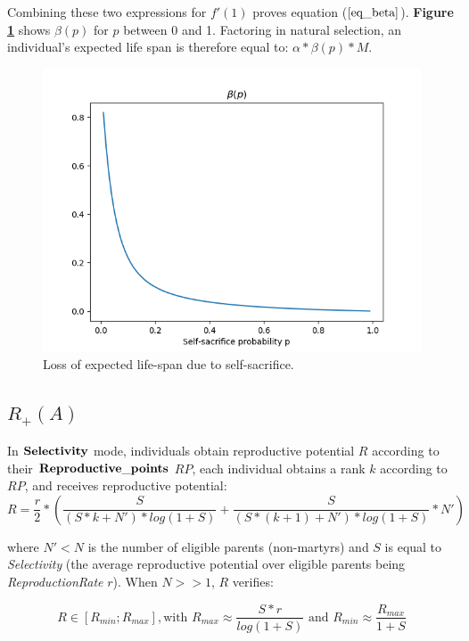 \documentclass[a4paper,12pt]{report}
\begin{document}
Combining these two expressions for $f'(1)$ proves equation ($\bf\ref{eq_beta}$). \textbf{Figure \ref{fig:beta}} shows
$\beta(p)$ for $p$ between 0 and 1. Factoring in natural selection, an individual's expected life span is therefore equal to: $\alpha*\beta(p)*M$.

\begin{figure}[h]
    \centering
    \includegraphics[width=1\textwidth]{Beta}
    \caption{Loss of expected life-span due to self-sacrifice.}
    \label{fig:beta}
    \end{figure}
    



\subsection{$R_{+}(A)$}
\label{ss:R+}
In $\bf{Selectivity}$ mode, individuals obtain reproductive potential $R$ according to their
$\bf{Reproductive\_points}$ $RP$, each individual obtains a rank $k$
according to $RP$, and receives reproductive potential:
\[ R = \frac{r}{2} * (\frac{S}
{(S*k + N')*log(1+S)} + \frac{S}{(S*(k+1) + N')*log(1+S)}*N') \]

where $N'<N$ is the number of eligible parents (non-martyrs) and $S$ is equal to \emph{Selectivity}
(the average reproductive potential over eligible parents being \emph{ReproductionRate} $r$).
When $N >> 1$, $R$ verifies:

\begin{equation}
    R \in [R_{min};R_{max}], \textrm{with } R_{max} \approx \frac{S*r}{log(1+S)} 
    \textrm{ and } R_{min} \approx
    \frac{R_{max}}{1+S}
\label{eq:ReproPot}
\end{equation}
\end{document}
